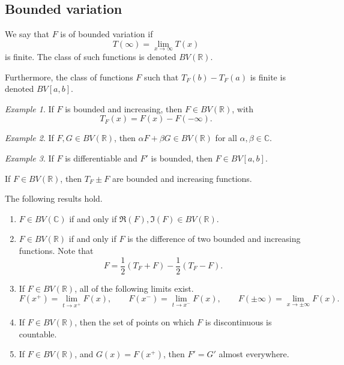 \documentclass[11pt]{article}
\renewcommand{\C}{\mathbb{C}}
\newcommand{\R}{\mathbb{R}}
\theoremstyle{definition}
\theoremstyle{remark}
\newtheorem*{example}{Example}
\begin{document}
    \subsection{Bounded variation}

    \begin{definition}
        We say that $F$ is of bounded variation if \[
            T(\infty) = \lim_{x \to \infty} T(x)
        \] is finite. The class of such functions is denoted $BV(\R)$.

        Furthermore, the class of functions $F$ such that $T_F(b) - T_F(a)$ is finite
        is denoted $BV[a, b]$.
    \end{definition}

    \begin{example}
        If $F$ is bounded and increasing, then $F \in BV(\R)$, with \[
            T_F(x) = F(x) - F(-\infty).
        \]
    \end{example}
    \begin{example}
        If $F, G \in BV(\R)$, then $\alpha F + \beta G \in BV(\R)$ for all $\alpha,
        \beta \in \C$.
    \end{example}
    \begin{example}
        If $F$ is differentiable and $F'$ is bounded, then $F \in BV[a, b]$.
    \end{example}

    \begin{lemma}
        If $F \in BV(\R)$, then $T_F \pm F$ are bounded and increasing functions.
    \end{lemma}

    \begin{theorem}
        The following results hold.
        \begin{enumerate}
            \item $F \in BV(\C)$ if and only if $\Re(F), \Im(F) \in BV(\R)$.
            \item $F \in BV(\R)$ if and only if $F$ is the difference of two bounded
            and increasing functions. Note that \[
                F = \frac{1}{2}(T_F + F) - \frac{1}{2}(T_F - F).
            \]
            \item If $F \in BV(\R)$, all of the following limits exist. \[
                F(x^+) = \lim_{t \to x^+} F(x), \qquad
                F(x^-) = \lim_{t \to x^-} F(x), \qquad
                F(\pm\infty) = \lim_{x \to \pm\infty} F(x).
            \]
            \item If $F \in BV(\R)$, then the set of points on which $F$ is
            discontinuous is countable.
            \item If $F \in BV(\R)$, and $G(x) = F(x^+)$, then $F' = G'$ almost
            everywhere.
        \end{enumerate}
    \end{theorem}
\end{document}
